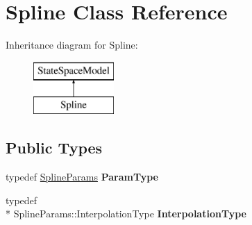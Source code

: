 \hypertarget{classSpline}{\section{Spline Class Reference}
\label{classSpline}
}
Inheritance diagram for Spline\-:\begin{figure}[H]
\begin{center}
\leavevmode
\includegraphics[height=2.000000cm]{classSpline}
\end{center}
\end{figure}
\subsection*{Public Types}
\begin{DoxyCompactItemize}
\item 
\hypertarget{classSpline_aed8fb26482149c3bcb198657e128cc0a}{typedef \hyperlink{structSplineParams}{Spline\-Params} {\bfseries Param\-Type}}\label{classSpline_aed8fb26482149c3bcb198657e128cc0a}

\item 
\hypertarget{classSpline_aaf6be0ed67ba808a1af1c2b3a82d6f62}{typedef \\*
Spline\-Params\-::\-Interpolation\-Type {\bfseries Interpolation\-Type}}\label{classSpline_aaf6be0ed67ba808a1af1c2b3a82d6f62}

\end{DoxyCompactItemize}
